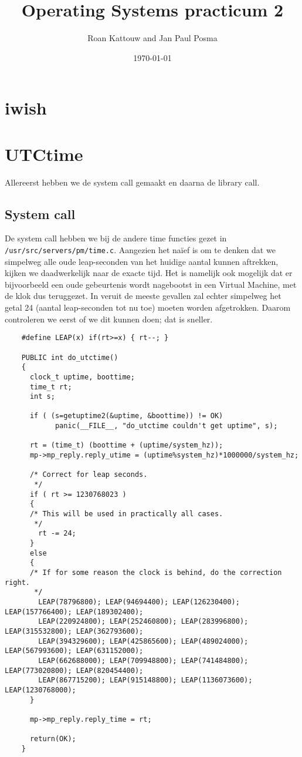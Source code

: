 \documentclass[11pt]{article}
\begin{document}
\author{Roan Kattouw and Jan Paul Posma}
\date{\today}
\title{Operating Systems practicum 2}

\maketitle

\section*{iwish}

\section*{UTCtime}
Allereerst hebben we de system call gemaakt en daarna de library call.

\subsection*{System call}
De system call hebben we bij de andere time functies gezet in \verb+/usr/src/servers/pm/time.c+.
Aangezien het na\"ief is om te denken dat we simpelweg alle oude leap-seconden van het huidige
aantal kunnen aftrekken, kijken we daadwerkelijk naar de exacte tijd. Het is namelijk ook mogelijk
dat er bijvoorbeeld een oude gebeurtenis wordt nagebootst in een Virtual Machine, met de klok
dus teruggezet. In veruit de meeste gevallen zal echter simpelweg het getal 24 (aantal leap-seconden tot
nu toe) moeten worden afgetrokken. Daarom controleren we eerst of we dit kunnen doen; dat is sneller.

\begin{verbatim}
	#define LEAP(x) if(rt>=x) { rt--; }

	PUBLIC int do_utctime()
	{
	  clock_t uptime, boottime;
	  time_t rt;
	  int s;
	
	  if ( (s=getuptime2(&uptime, &boottime)) != OK)
			panic(__FILE__, "do_utctime couldn't get uptime", s);
	
	  rt = (time_t) (boottime + (uptime/system_hz));
	  mp->mp_reply.reply_utime = (uptime%system_hz)*1000000/system_hz;
	  
	  /* Correct for leap seconds.
	   */
	  if ( rt >= 1230768023 )
	  {
	  /* This will be used in practically all cases.
	   */
	    rt -= 24;
	  }
	  else
	  {
	  /* If for some reason the clock is behind, do the correction right.
	   */
	    LEAP(78796800); LEAP(94694400); LEAP(126230400); LEAP(157766400); LEAP(189302400);
	    LEAP(220924800); LEAP(252460800); LEAP(283996800); LEAP(315532800); LEAP(362793600); 
	    LEAP(394329600); LEAP(425865600); LEAP(489024000); LEAP(567993600); LEAP(631152000); 
	    LEAP(662688000); LEAP(709948800); LEAP(741484800); LEAP(773020800); LEAP(820454400); 
	    LEAP(867715200); LEAP(915148800); LEAP(1136073600); LEAP(1230768000);
	  }
	  
	  mp->mp_reply.reply_time = rt;
	  
	  return(OK);
	}
\end{verbatim}
\end{document}
